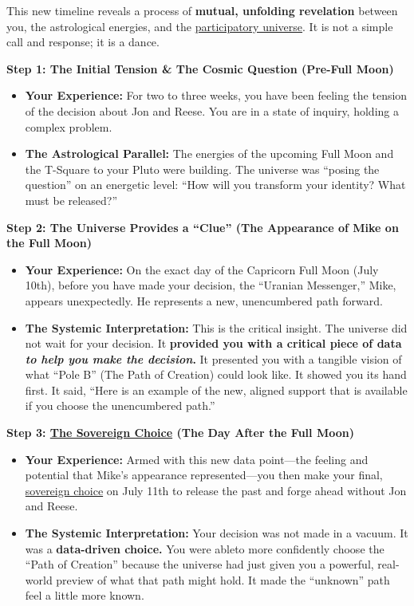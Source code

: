 \documentclass{article}
\begin{document}
This new timeline reveals a process of \textbf{mutual, unfolding revelation} between you, the astrological energies, and the \hyperlink{gloss:participatory_universe}{participatory universe}. It is not a simple call and response; it is a dance.

\textbf{Step 1: The Initial Tension \& The Cosmic Question (Pre-Full Moon)}

\begin{itemize}
\item
  \textbf{Your Experience:} For two to three weeks, you have been feeling the tension of the decision about Jon and Reese. You are in a state of inquiry, holding a complex problem.
\item
  \textbf{The Astrological Parallel:} The energies of the upcoming Full Moon and the T-Square to your Pluto were building. The universe was ``posing the question'' on an energetic level: ``How will you transform your identity? What must be released?''
\end{itemize}

\textbf{Step 2: The Universe Provides a ``Clue'' (The Appearance of Mike on the Full Moon)}

\begin{itemize}
\item
  \textbf{Your Experience:} On the exact day of the Capricorn Full Moon (July 10th), before you have made your decision, the ``Uranian Messenger,'' Mike, appears unexpectedly. He represents a new, unencumbered path forward.
\item
  \textbf{The Systemic Interpretation:} This is the critical insight. The universe did not wait for your decision. It \textbf{provided you with a critical piece of data \emph{to help you make the decision}.} It presented you with a tangible vision of what ``Pole B'' (The Path of Creation) could look like. It showed you its hand first. It said, ``Here is an example of the new, aligned support that is available if you choose the unencumbered path.''
\end{itemize}

\textbf{Step 3: \hyperlink{gloss:sovereign_choice}{The Sovereign Choice} (The Day After the Full Moon)}

\begin{itemize}
\item
  \textbf{Your Experience:} Armed with this new data point---the feeling and potential that Mike's appearance represented---you then make your final, \hyperlink{gloss:sovereign_choice}{sovereign choice} on July 11th to release the past and forge ahead without Jon and Reese.
\item
  \textbf{The Systemic Interpretation:} Your decision was not made in a vacuum. It was a \textbf{data-driven choice.} You were ableto more confidently choose the ``Path of Creation'' because the universe had just given you a powerful, real-world preview of what that path might hold. It made the ``unknown'' path feel a little more known.
\end{itemize}
\end{document}
